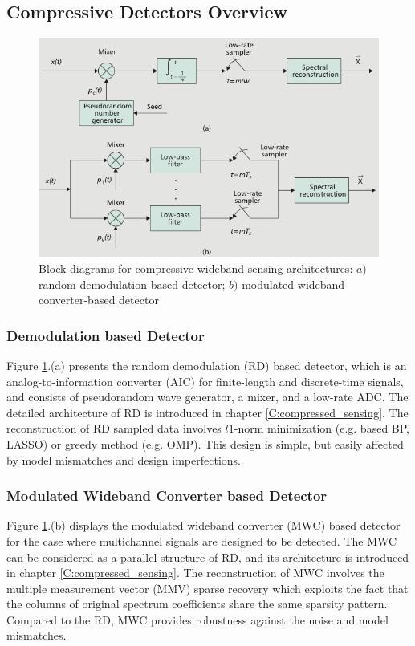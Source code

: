 \subsection{Compressive Detectors Overview}
\begin{figure}
\centering
\includegraphics[width=0.75\columnwidth]{figs/comp_spec_sens.png}
\caption{Block diagrams for compressive wideband sensing architectures: $a)$ random demodulation based detector; $b)$ modulated wideband converter-based detector}
\label{comp_spec_sens}
\end{figure} 

\subsubsection{Demodulation based Detector}  
Figure \ref{comp_spec_sens}.(a) presents the random demodulation (RD) based detector\cite{tropp2010beyond}, which is an analog-to-information converter (AIC) for finite-length and discrete-time signals, and consists of pseudorandom wave generator, a mixer, and a low-rate ADC. The detailed architecture of RD is introduced in chapter \ref{C:compressed_sensing}. The reconstruction of RD sampled data involves $l1$-norm minimization (e.g. based BP, LASSO) or greedy method (e.g. OMP).
This design is simple, but easily affected by model mismatches and design imperfections.

\subsubsection{Modulated Wideband Converter based Detector}
Figure \ref{comp_spec_sens}.(b) displays the modulated wideband converter (MWC) based detector \cite{mishali2009expected} for the case where multichannel signals are designed to be detected. The MWC can be considered as a parallel structure of RD, and its architecture is introduced in chapter \ref{C:compressed_sensing}. The reconstruction of MWC involves the multiple measurement vector (MMV) sparse recovery which exploits the fact that the columns of original spectrum coefficients share the same sparsity pattern. Compared to the RD, MWC provides robustness against the noise and model mismatches.


